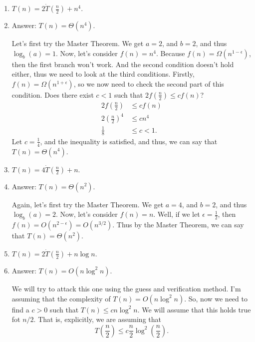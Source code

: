 \documentclass{article}
\begin{document}
 \begin{enumerate}[label=(\alph*)]
 \item $T(n) = 2\dot T\left(\frac{n}{2}\right) + n^4$.
 \item[] Answer: $T(n) = \Theta(n^4)$.

   Let's first try the Master Theorem.  We get $a = 2$, and $b = 2$,
   and thus $ \log_b(a) = 1$. Now, let's consider $f(n) = n^4$.
   Because $f(n) = \Omega(n^{1-\epsilon})$, then the first branch
   won't work.  And the second condition doesn't hold either, thus we
   need to look at the third conditions. Firstly, $f(n) =
   \Omega(n^{1+\epsilon})$, so we now need to check the second part of
   this condition.  Does there exist $c < 1$ such that $2f(\frac{n}{2})
   \le cf(n)$?
   \begin{equation}
     \begin{split}
     2f\left(\frac{n}{2}\right) &\le c f(n)\\
     2\left(\frac{n}{2}\right)^4 &\le cn^4\\
     \frac{1}{8} & \le c < 1.
     \end{split}
   \end{equation}
Let $c = \frac{1}{4}$, and the inequality is satisfied, and thus, we
can say that $T(n) = \Theta(n^4)$.
 \item $T(n) = 4\dot T\left(\frac{n}{2}\right) + n$.
 \item[] Answer: $T(n) = \Theta(n^2)$.

   Again, let's first try the Master Theorem.  We get $a = 4$, and $b
   = 2$, and thus $ \log_b(a) = 2$. Now, let's consider $f(n) = n$. 
   Well, if we let $\epsilon = \frac{1}{2}$, then $f(n) = O(n^{2 -
     \epsilon}) = O(n^{3/2})$.  Thus by the Master Theorem, we can say
   that $T(n) = \Theta(n^2)$.

 \item $T(n) = 2\dot T\left(\frac{n}{2}\right) + n\log n$.
 \item[] Answer: $T(n) = O(n\log^2 n)$.

   We will try to attack this one using the guess and verification
   method. I'm assuming that the complexity of $T(n) = O(n\log^2
   n)$. So, now we need to find a $c > 0$ such that $T(n) \le cn\log^2
   n$. We will assume that this holds true fot $n/2$. That is,
   explicitly, we are assuming that 
   \begin{equation}
     T\left(\frac{n}{2}\right) \le c
     \frac{n}{2}\log^2\left(\frac{n}{2}\right).
   \end{equation}
   

\end{enumerate}
\end{document}
